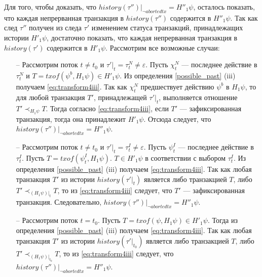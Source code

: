 \begin{myproof}
Для того, чтобы доказать, что $history(\tau'')|_{\neg abortedtx} = H''_1\psi$, осталось показать, что каждая непрерванная транзакция в $history(\tau'')$ содержится в $H''_1\psi$. Так как след $\tau''$ получен из следа $\tau'$ изменением статуса транзакций, принадлежащих истории $H'_1\psi$, достаточно показать, что каждая непрерванная транзакция в $history(\tau')$ содержится в $H'_1\psi$. Рассмотрим все возможные случаи:
\begin{itemize}
\item[--] Рассмотрим поток $t \neq t_0$ и $\tau'|_t = \tau^N_t \neq \varepsilon$. Пусть $\chi^N_t$ --- последнее действие в $\tau^N_t$ и $T = txof(\psi^b, H_1\psi) \in H'_1\psi$. Из определения \ref{possible_past} (iii) получаем \eqref{eq:transform4iii}. Так как $\chi^N_t$ предшествует действию $\psi^b$ в $H_1\psi$, то для любой транзакция $T'$, принадлежащей $\tau'|_t$, выполняется отношение $T' \prec_{H_1\psi} T$. Тогда согласно \eqref{eq:transform4iii}, если $T'$ --- зафиксированная транзакция, тогда она принадлежит $H'_1\psi$. Отсюда следует, что $history(\tau'')|_{\neg abortedtx} = H''_1\psi$.
\item[--] Рассмотрим поток $t \neq t_0$ и $\tau'|_t = \tau^I_t \neq \varepsilon$. Пусть $\psi^I_t$ --- последнее действие в $\tau^I_t$. Пусть $T = txof(\psi^I_t, H_1\psi)$. $T \in H'_1\psi$ в соответствии с выбором $\tau^I_t$. Из определения \ref{possible_past} (iii) получаем \eqref{eq:transform4iii}. Так как любая транзакция $T'$ из истории $history(\tau'|_t)$ является либо транзакцией $T$, либо $T' \prec_{(H_1\psi)|_t} T$, то из \eqref{eq:transform4iii} следует, что $T'$ --- зафиксированная транзакция. Следовательно, $history(\tau'')|_{\neg abortedtx} = H''_1\psi$.
\item[--] Рассмотрим поток $t = t_0$. Пусть $T = txof(\psi, H_1\psi) \in H'_1\psi$. Тогда из определения \ref{possible_past} (iii) получаем \eqref{eq:transform4iii}. Так как любая транзакция $T'$ из истории $history(\tau'|_{t_0})$ является либо транзакцией $T$, либо $T' \prec_{(H_1\psi)|_{t_0}} T$, то из \eqref{eq:transform4iii} следует, что $history(\tau'')|_{\neg abortedtx} = H''_1\psi$.
\end{itemize}
\end{myproof}


